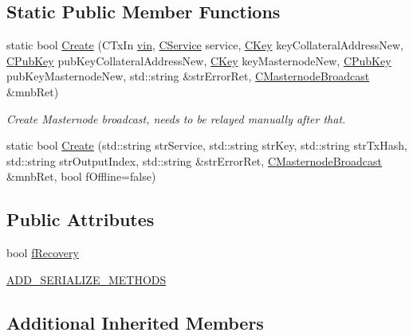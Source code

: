 \subsection*{Static Public Member Functions}
\begin{DoxyCompactItemize}
\item 
static bool \mbox{\hyperlink{class_c_masternode_broadcast_a3b331bac6aa4ab8ece112b62243f7498}{Create}} (C\+Tx\+In \mbox{\hyperlink{class_c_masternode_a485b26778bb8b006152aaa64168afe6b}{vin}}, \mbox{\hyperlink{class_c_service}{C\+Service}} service, \mbox{\hyperlink{class_c_key}{C\+Key}} key\+Collateral\+Address\+New, \mbox{\hyperlink{class_c_pub_key}{C\+Pub\+Key}} pub\+Key\+Collateral\+Address\+New, \mbox{\hyperlink{class_c_key}{C\+Key}} key\+Masternode\+New, \mbox{\hyperlink{class_c_pub_key}{C\+Pub\+Key}} pub\+Key\+Masternode\+New, std\+::string \&str\+Error\+Ret, \mbox{\hyperlink{class_c_masternode_broadcast}{C\+Masternode\+Broadcast}} \&mnb\+Ret)
\begin{DoxyCompactList}\small\item\em Create Masternode broadcast, needs to be relayed manually after that. \end{DoxyCompactList}\item 
static bool \mbox{\hyperlink{class_c_masternode_broadcast_a5b999adcbdb1de059cb226f3367771b0}{Create}} (std\+::string str\+Service, std\+::string str\+Key, std\+::string str\+Tx\+Hash, std\+::string str\+Output\+Index, std\+::string \&str\+Error\+Ret, \mbox{\hyperlink{class_c_masternode_broadcast}{C\+Masternode\+Broadcast}} \&mnb\+Ret, bool f\+Offline=false)
\end{DoxyCompactItemize}
\subsection*{Public Attributes}
\begin{DoxyCompactItemize}
\item 
bool \mbox{\hyperlink{class_c_masternode_broadcast_a7a10ab15299638456c0be9b63821cb36}{f\+Recovery}}
\item 
\mbox{\hyperlink{class_c_masternode_broadcast_a3b423bd09c06dbb8b75dc06d3d34a4b0}{A\+D\+D\+\_\+\+S\+E\+R\+I\+A\+L\+I\+Z\+E\+\_\+\+M\+E\+T\+H\+O\+DS}}
\end{DoxyCompactItemize}
\subsection*{Additional Inherited Members}


